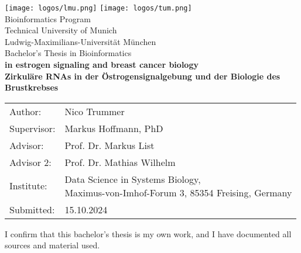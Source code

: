 \documentclass[pdftex,12pt,a4paper]{report}
\begin{document}
\begin{titlepage}

    \begin{center}
        \texttt{[image: logos/lmu.png]}
        \hfill
        \texttt{[image: logos/tum.png]}
        \\[3cm]

        {\Large Bioinformatics Program}\\[0.5cm]
        {\Large Technical University of Munich}\\[0.5cm]
        {\Large Ludwig-Maximilians-Universit\"at M\"unchen}\\[1cm]
        {\Large Bachelor's Thesis in Bioinformatics}\\[1.5cm]
        {\textbf{\LARGE {} in estrogen signaling and
            breast cancer
            biology}}\\[1.5cm]
        {\textbf{\LARGE Zirkul\"are RNAs in der \"Ostrogensignalgebung und
            der
            Biologie des
            Brustkrebses}}\\[2cm]

    \end{center}

    \begin{center}\Large
        \begin{tabular}{ll}
            Author: & Nico Trummer \\ Supervisor: & Markus Hoffmann, PhD \\ Advisor: &
               Prof.
               Dr.
            Markus List            \\ Advisor 2: & Prof.
               Dr.
            Mathias Wilhelm        \\ Institute: & \makecell[l]{Data Science in Systems
            Biology,               \\ Maximus-von-Imhof-Forum 3, 85354 Freising,
            Germany}               \\ Submitted: & 15.10.2024\end{tabular} \end{center}

\end{titlepage} 

\noindent I confirm that this bachelor's thesis is my own work, and I have
documented all sources and material used.

\vspace{3cm}
\end{document}
